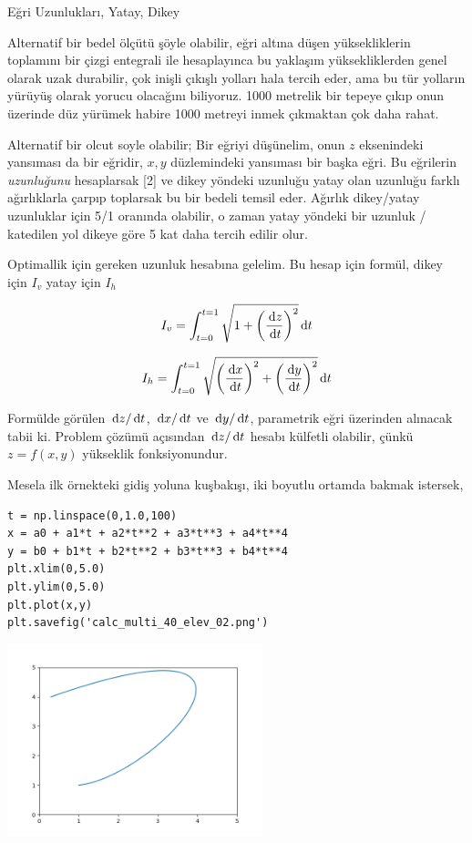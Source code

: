 \documentclass[12pt,fleqn]{article}\usepackage{../../common}
\begin{document}
Eğri Uzunlukları, Yatay, Dikey

Alternatif bir bedel ölçütü şöyle olabilir, eğri altına düşen yüksekliklerin
toplamını bir çizgi entegrali ile hesaplayınca bu yaklaşım yüksekliklerden genel
olarak uzak durabilir, çok inişli çıkışlı yolları hala tercih eder, ama bu tür
yolların yürüyüş olarak yorucu olacağını biliyoruz. 1000 metrelik bir tepeye
çıkıp onun üzerinde düz yürümek habire 1000 metreyi inmek çıkmaktan çok daha
rahat.

Alternatif bir olcut soyle olabilir; Bir eğriyi düşünelim, onun $z$ eksenindeki
yansıması da bir eğridir, $x,y$ düzlemindeki yansıması bir başka eğri. Bu
eğrilerin {\em uzunluğunu} hesaplarsak [2] ve dikey yöndeki uzunluğu yatay olan
uzunluğu farklı ağırlıklarla çarpıp toplarsak bu bir bedeli temsil eder. Ağırlık
dikey/yatay uzunluklar için 5/1 oranında olabilir, o zaman yatay yöndeki bir
uzunluk / katedilen yol dikeye göre 5 kat daha tercih edilir olur.

Optimallik için gereken uzunluk hesabına gelelim. Bu hesap için
formül, dikey için $I_v$ yatay için $I_h$

$$
I_v = \int_{t=0}^{t=1} \sqrt{1 + \left(\frac{\,\mathrm{d} z}{\,\mathrm{d} t} \right)^2 } \,\mathrm{d} t
$$

$$
I_h = \int_{t=0}^{t=1} \sqrt{
\left(\frac{\,\mathrm{d} x}{\,\mathrm{d} t} \right)^2 + 
\left(\frac{\,\mathrm{d} y}{\,\mathrm{d} t} \right)^2
} 
\,\mathrm{d} t
$$

Formülde görülen $\,\mathrm{d} z/\,\mathrm{d} t$, $\,\mathrm{d} x/\,\mathrm{d} t$ ve $\,\mathrm{d} y/\,\mathrm{d} t$, parametrik eğri
üzerinden alınacak tabii ki. Problem çözümü açısından $\,\mathrm{d} z/\,\mathrm{d} t$ hesabı
külfetli olabilir, çünkü $z = f(x,y)$ yükseklik fonksiyonundur.

Mesela ilk örnekteki gidiş yoluna kuşbakışı, iki boyutlu ortamda bakmak
istersek,

\begin{verbatim}
t = np.linspace(0,1.0,100)
x = a0 + a1*t + a2*t**2 + a3*t**3 + a4*t**4 
y = b0 + b1*t + b2*t**2 + b3*t**3 + b4*t**4
plt.xlim(0,5.0)
plt.ylim(0,5.0)
plt.plot(x,y)
plt.savefig('calc_multi_40_elev_02.png')
\end{verbatim}

\includegraphics[width=20em]{calc_multi_40_elev_02.png}
\end{document}
